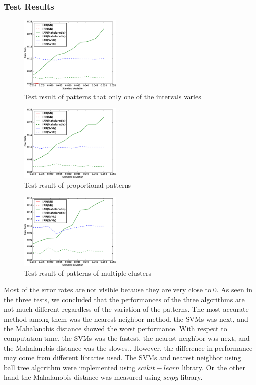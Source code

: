 \documentclass[twocolumn,showpacs,%
  nofootinbib,aps,%
  eqsecnum,prd,notitlepage,showkeys,10pt]{revtex4-1}
\begin{document}
\subsubsection{Test Results}
\begin{figure}[ht]
  \centering
  \includegraphics[width=0.44\textwidth]{one}
  \caption{Test result of patterns that only one of the intervals varies}
  \label{fig:one}
\end{figure}
\begin{figure}[ht]
  \centering
  \includegraphics[width=0.44\textwidth]{prop}
  \caption{Test result of proportional patterns}
  \label{fig:prop}
\end{figure}
\begin{figure}[ht]
  \centering
  \includegraphics[width=0.44\textwidth]{multi}
  \caption{Test result of patterns of multiple clusters}
  \label{fig:multi}
\end{figure}

Most of the error rates are not visible because they are very close to 0. As seen in the three tests, we concluded that the performances of the three algorithms are not much different regardless of the variation of the patterns. The most accurate method among them was the nearest neighbor method, the SVMs was next, and the Mahalanobis distance showed the worst performance. With respect to computation time, the SVMs was the fastest, the nearest neighbor was next, and the Mahalanobis distance was the slowest. However, the difference in performance may come from different libraries used. The SVMs and nearest neighbor using ball tree algorithm were implemented using $scikit-learn$ library. On the other hand the Mahalanobis distance was measured using $scipy$ library.
\end{document}
